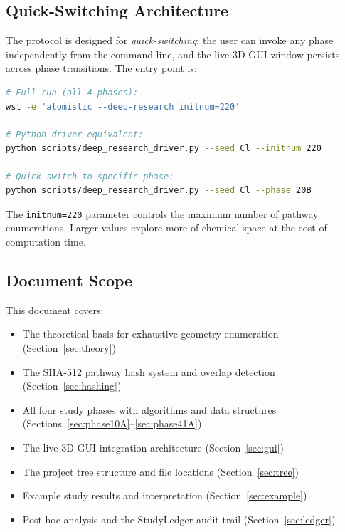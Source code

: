\documentclass[11pt,a4paper]{article}
\begin{document}
\subsection{Quick-Switching Architecture}

The protocol is designed for \emph{quick-switching}: the user can
invoke any phase independently from the command line, and the live
3D GUI window persists across phase transitions.  The entry point is:

\begin{lstlisting}[language=bash,title={\textbf{CLI entry point}}]
# Full run (all 4 phases):
wsl -e 'atomistic --deep-research initnum=220'

# Python driver equivalent:
python scripts/deep_research_driver.py --seed Cl --initnum 220

# Quick-switch to specific phase:
python scripts/deep_research_driver.py --seed Cl --phase 20B
\end{lstlisting}

The \texttt{initnum=220} parameter controls the maximum number of
pathway enumerations.  Larger values explore more of chemical space
at the cost of computation time.

\subsection{Document Scope}

This document covers:

\begin{itemize}
  \item The theoretical basis for exhaustive geometry enumeration
        (Section~\ref{sec:theory})
  \item The SHA-512 pathway hash system and overlap detection
        (Section~\ref{sec:hashing})
  \item All four study phases with algorithms and data structures
        (Sections~\ref{sec:phase10A}--\ref{sec:phase41A})
  \item The live 3D GUI integration architecture
        (Section~\ref{sec:gui})
  \item The project tree structure and file locations
        (Section~\ref{sec:tree})
  \item Example study results and interpretation
        (Section~\ref{sec:example})
  \item Post-hoc analysis and the StudyLedger audit trail
        (Section~\ref{sec:ledger})
\end{itemize}
\end{document}
